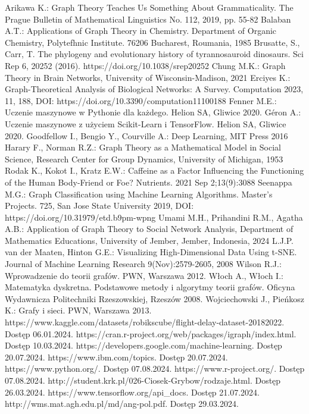 
\begin{thebibliography}{4}
     Arikawa K.: Graph Theory Teaches Us Something About Grammaticality. The Prague Bulletin of Mathematical Linguistics No. 112, 2019, pp. 55-82
     Balaban A.T.: Applications of Graph Theory in Chemistry. Department of Organic Chemistry, Polytefhnic Institute. 76206 Bucharest, Roumania, 1985
     Brusatte, S., Carr, T. The phylogeny and evolutionary history of tyrannosauroid dinosaurs. Sci Rep 6, 20252 (2016). https://doi.org/10.1038/srep20252
     Chung M.K.: Graph Theory in Brain Networks, University of Wisconsin-Madison, 2021 
     Erciyes K.: Graph-Theoretical Analysis of Biological Networks: A Survey. Computation 2023, 11, 188, DOI: https://doi.org/10.3390/computation11100188
     Fenner M.E.: Uczenie maszynowe w Pythonie dla każdego. Helion SA, Gliwice 2020.
     Géron A.: Uczenie maszynowe z użyciem Scikit-Learn i TensorFlow. Helion SA, Gliwice 2020.
     Goodfellow I., Bengio Y., Courville A.: Deep Learning, MIT Press 2016
     Harary F., Norman R.Z.: Graph Theory as a Mathematical Model in Social Science, Research Center for Group Dynamics, University of Michigan, 1953
     Rodak K., Kokot I., Kratz E.W.: Caffeine as a Factor Influencing the Functioning of the Human Body-Friend or Foe? Nutrients. 2021 Sep 2;13(9):3088
     Seenappa M.G.: Graph Classification using Machine Learning Algorithms. Master's Projects. 725, San Jose State University 2019, DOI: https://doi.org/10.31979/etd.b9pm-wpng
     Umami M.H., Prihandini R.M., Agatha A.B.: Application of Graph Theory to Social Network Analysis, Department of Mathematics Educations, University of Jember, Jember, Indonesia, 2024
     L.J.P. van der Maaten, Hinton G.E.: Visualizing High-Dimensional Data Using t-SNE. Journal of Machine Learning Research 9(Nov):2579-2605, 2008
     Wilson R.J.: Wprowadzenie do teorii grafów. PWN, Warszawa 2012.
     Włoch A., Włoch I.: Matematyka dyskretna. Podstawowe metody i algorytmy teorii grafów. Oficyna Wydawnicza Politechniki Rzeszowskiej, Rzeszów 2008.
     Wojciechowski J., Pieńkosz K.: Grafy i sieci. PWN, Warszawa 2013.
     https://www.kaggle.com/datasets/robikscube/flight-delay-dataset-20182022. Dostęp 06.01.2024.
     https://cran.r-project.org/web/packages/igraph/index.html. Dostęp 10.03.2024.
     https://developers.google.com/machine-learning. Dostęp 20.07.2024.
     https://www.ibm.com/topics. Dostęp 20.07.2024.
     https://www.python.org/. Dostęp 07.08.2024.
     https://www.r-project.org/. Dostęp 07.08.2024.
     http://student.krk.pl/026-Ciosek-Grybow/rodzaje.html. Dostęp 26.03.2024.
     https://www.tensorflow.org/api\_docs. Dostęp 21.07.2024.
     http://wms.mat.agh.edu.pl/\texttildelow md/ang-pol.pdf. Dostęp 29.03.2024.
\end{thebibliography}